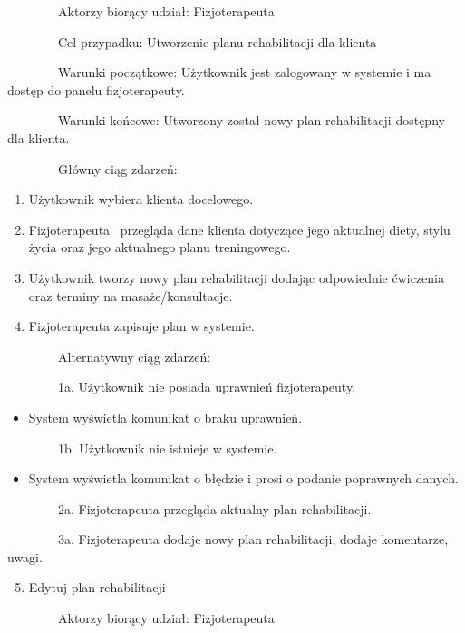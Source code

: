 \documentclass[
]{article}
\providecommand{\tightlist}{%
  \setlength{\itemsep}{0pt}\setlength{\parskip}{0pt}}
\begin{document}
{~~~~~~~~}{Aktorzy biorący udział: Fizjoterapeuta}

{~~~~~~~~Cel przypadku: Utworzenie planu rehabilitacji dla klienta}

{~~~~~~~~Warunki początkowe: Użytkownik jest zalogowany w systemie i ma
dostęp do panelu fizjoterapeuty.}

{~~~~~~~~Warunki końcowe: Utworzony został nowy plan rehabilitacji
dostępny dla klienta.}

{~~~~~~~~Główny ciąg zdarzeń:}

\begin{enumerate}
\tightlist
\item
  {Użytkownik wybiera klienta docelowego.}
\item
  {Fizjoterapeuta ~przegląda dane klienta dotyczące jego aktualnej
  diety, stylu życia oraz jego aktualnego planu treningowego.}
\item
  {Użytkownik tworzy nowy plan rehabilitacji dodając odpowiednie
  ćwiczenia oraz terminy na masaże/konsultacje.}
\item
  {Fizjoterapeuta zapisuje plan w systemie.}
\end{enumerate}

{~~~~~~~~Alternatywny ciąg zdarzeń:}

{~~~~~~~~1a. Użytkownik nie posiada uprawnień fizjoterapeuty.}

\begin{itemize}
\tightlist
\item
  {System wyświetla komunikat o braku uprawnień.}
\end{itemize}

{~~~~~~~~1b. Użytkownik nie istnieje w systemie.}

\begin{itemize}
\tightlist
\item
  {System wyświetla komunikat o błędzie i prosi o podanie poprawnych
  danych.}
\end{itemize}

{~~~~~~~~2a. Fizjoterapeuta przegląda aktualny plan rehabilitacji.}

{~~~~~~~~3a. Fizjoterapeuta dodaje nowy plan rehabilitacji, dodaje
komentarze, uwagi.}

{}

\begin{enumerate}
\setcounter{enumi}{4}
\tightlist
\item
  {Edytuj plan rehabilitacji}
\end{enumerate}

{~~~~~~~~}{Aktorzy biorący udział: Fizjoterapeuta}
\end{document}

